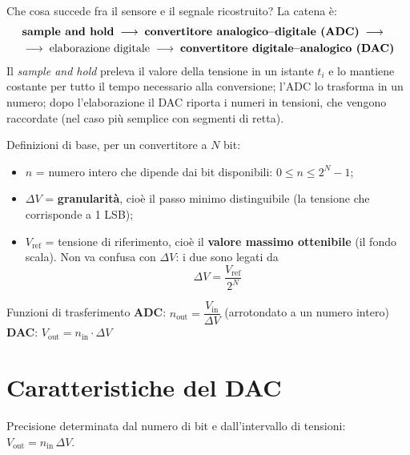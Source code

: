 \noindent Che cosa succede fra il sensore e il segnale ricostruito? La catena è:
\begin{align*}
&\text{\textbf{sample and hold}} \;\longrightarrow\; \text{\textbf{convertitore analogico--digitale (ADC)}} \;\longrightarrow\\
&\longrightarrow\; \text{elaborazione digitale} \;\longrightarrow\; \text{\textbf{convertitore digitale--analogico (DAC)}}
\end{align*}
Il \emph{sample and hold} preleva il valore della tensione in un istante $t_i$ e lo mantiene
costante per tutto il tempo necessario alla conversione; l'ADC lo trasforma in un numero;
dopo l'elaborazione il DAC riporta i numeri in tensioni, che vengono raccordate
(nel caso più semplice con segmenti di retta).

\medskip
\noindent Definizioni di base, per un convertitore a $N$ bit:
\begin{itemize}[leftmargin=1.5em, itemsep=2pt]
    \item $n$ = numero intero che dipende dai bit disponibili: $0 \le n \le 2^N-1$;
    \item $\Delta V$ = \textbf{granularità}, cioè il passo minimo distinguibile (la tensione
          che corrisponde a 1 LSB);
    \item $V_{\text{ref}}$ = tensione di riferimento, cioè il \textbf{valore massimo
          ottenibile} (il fondo scala). Non va confusa con $\Delta V$: i due sono legati da
          \[
          \Delta V = \frac{V_{\text{ref}}}{2^N}
          \]
\end{itemize}

\begin{definizione}{Funzioni di trasferimento}
\textbf{ADC}: \quad $n_{\text{out}} = \dfrac{V_{\text{in}}}{\Delta V}$ \quad (arrotondato a un
numero intero)\\[0.6em]
\textbf{DAC}: \quad $V_{\text{out}} = n_{\text{in}} \cdot \Delta V$
\end{definizione}

\section{Caratteristiche del DAC}

\begin{definizione}{Precisione}
determinata dal numero di bit e dall'intervallo di tensioni: $V_{\text{out}} = n_{\text{in}}\,\Delta V$.
\end{definizione}

